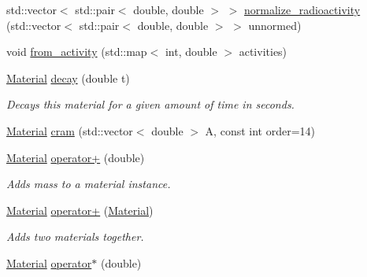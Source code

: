 \begin{DoxyCompactItemize}
\item 
std\+::vector$<$ std\+::pair$<$ double, double $>$ $>$ \hyperlink{classpyne_1_1_material_a114deb10e8d118bbd37ade0fbce5253d}{normalize\+\_\+radioactivity} (std\+::vector$<$ std\+::pair$<$ double, double $>$ $>$ unnormed)
\item 
void \hyperlink{classpyne_1_1_material_a72d3e72ef2a639575b721186a4afdf62}{from\+\_\+activity} (std\+::map$<$ int, double $>$ activities)
\item 
\mbox{\label{classpyne_1_1_material_a1b9decf23001574896c3413265677307}} 
\hyperlink{classpyne_1_1_material}{Material} \hyperlink{classpyne_1_1_material_a1b9decf23001574896c3413265677307}{decay} (double t)
\begin{DoxyCompactList}\small\item\em Decays this material for a given amount of time in seconds. \end{DoxyCompactList}\item 
\hyperlink{classpyne_1_1_material}{Material} \hyperlink{classpyne_1_1_material_a1276332d8cc094d3cd51f9c933a70a5f}{cram} (std\+::vector$<$ double $>$ A, const int order=14)
\item 
\mbox{\label{classpyne_1_1_material_a97bae8b18322f26e1cd87d8909ce42b6}} 
\hyperlink{classpyne_1_1_material}{Material} \hyperlink{classpyne_1_1_material_a97bae8b18322f26e1cd87d8909ce42b6}{operator+} (double)
\begin{DoxyCompactList}\small\item\em Adds mass to a material instance. \end{DoxyCompactList}\item 
\mbox{\label{classpyne_1_1_material_a1913e1a1b525352bf4f0b4155b6d39b7}} 
\hyperlink{classpyne_1_1_material}{Material} \hyperlink{classpyne_1_1_material_a1913e1a1b525352bf4f0b4155b6d39b7}{operator+} (\hyperlink{classpyne_1_1_material}{Material})
\begin{DoxyCompactList}\small\item\em Adds two materials together. \end{DoxyCompactList}\item 
\mbox{\label{classpyne_1_1_material_a6a924c97822bc791e0b47d4940c8bea3}} 
\hyperlink{classpyne_1_1_material}{Material} \hyperlink{classpyne_1_1_material_a6a924c97822bc791e0b47d4940c8bea3}{operator$\ast$} (double)

\end{DoxyCompactItemize}
